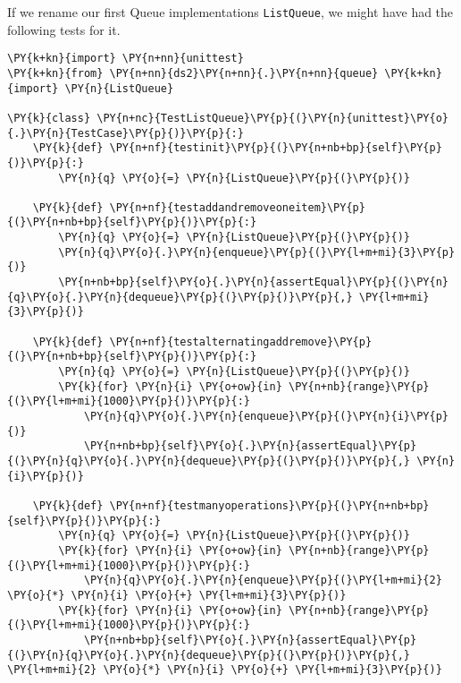 If we rename our first Queue implementations \texttt{ListQueue}, we might have had the following tests for it.


\begin{Verbatim}[commandchars=\\\{\}]
\PY{k+kn}{import} \PY{n+nn}{unittest}
\PY{k+kn}{from} \PY{n+nn}{ds2}\PY{n+nn}{.}\PY{n+nn}{queue} \PY{k+kn}{import} \PY{n}{ListQueue}

\PY{k}{class} \PY{n+nc}{TestListQueue}\PY{p}{(}\PY{n}{unittest}\PY{o}{.}\PY{n}{TestCase}\PY{p}{)}\PY{p}{:}
    \PY{k}{def} \PY{n+nf}{testinit}\PY{p}{(}\PY{n+nb+bp}{self}\PY{p}{)}\PY{p}{:}
        \PY{n}{q} \PY{o}{=} \PY{n}{ListQueue}\PY{p}{(}\PY{p}{)}

    \PY{k}{def} \PY{n+nf}{testaddandremoveoneitem}\PY{p}{(}\PY{n+nb+bp}{self}\PY{p}{)}\PY{p}{:}
        \PY{n}{q} \PY{o}{=} \PY{n}{ListQueue}\PY{p}{(}\PY{p}{)}
        \PY{n}{q}\PY{o}{.}\PY{n}{enqueue}\PY{p}{(}\PY{l+m+mi}{3}\PY{p}{)}
        \PY{n+nb+bp}{self}\PY{o}{.}\PY{n}{assertEqual}\PY{p}{(}\PY{n}{q}\PY{o}{.}\PY{n}{dequeue}\PY{p}{(}\PY{p}{)}\PY{p}{,} \PY{l+m+mi}{3}\PY{p}{)}

    \PY{k}{def} \PY{n+nf}{testalternatingaddremove}\PY{p}{(}\PY{n+nb+bp}{self}\PY{p}{)}\PY{p}{:}
        \PY{n}{q} \PY{o}{=} \PY{n}{ListQueue}\PY{p}{(}\PY{p}{)}
        \PY{k}{for} \PY{n}{i} \PY{o+ow}{in} \PY{n+nb}{range}\PY{p}{(}\PY{l+m+mi}{1000}\PY{p}{)}\PY{p}{:}
            \PY{n}{q}\PY{o}{.}\PY{n}{enqueue}\PY{p}{(}\PY{n}{i}\PY{p}{)}
            \PY{n+nb+bp}{self}\PY{o}{.}\PY{n}{assertEqual}\PY{p}{(}\PY{n}{q}\PY{o}{.}\PY{n}{dequeue}\PY{p}{(}\PY{p}{)}\PY{p}{,} \PY{n}{i}\PY{p}{)}

    \PY{k}{def} \PY{n+nf}{testmanyoperations}\PY{p}{(}\PY{n+nb+bp}{self}\PY{p}{)}\PY{p}{:}
        \PY{n}{q} \PY{o}{=} \PY{n}{ListQueue}\PY{p}{(}\PY{p}{)}
        \PY{k}{for} \PY{n}{i} \PY{o+ow}{in} \PY{n+nb}{range}\PY{p}{(}\PY{l+m+mi}{1000}\PY{p}{)}\PY{p}{:}
            \PY{n}{q}\PY{o}{.}\PY{n}{enqueue}\PY{p}{(}\PY{l+m+mi}{2} \PY{o}{*} \PY{n}{i} \PY{o}{+} \PY{l+m+mi}{3}\PY{p}{)}
        \PY{k}{for} \PY{n}{i} \PY{o+ow}{in} \PY{n+nb}{range}\PY{p}{(}\PY{l+m+mi}{1000}\PY{p}{)}\PY{p}{:}
            \PY{n+nb+bp}{self}\PY{o}{.}\PY{n}{assertEqual}\PY{p}{(}\PY{n}{q}\PY{o}{.}\PY{n}{dequeue}\PY{p}{(}\PY{p}{)}\PY{p}{,} \PY{l+m+mi}{2} \PY{o}{*} \PY{n}{i} \PY{o}{+} \PY{l+m+mi}{3}\PY{p}{)}


\end{Verbatim}

